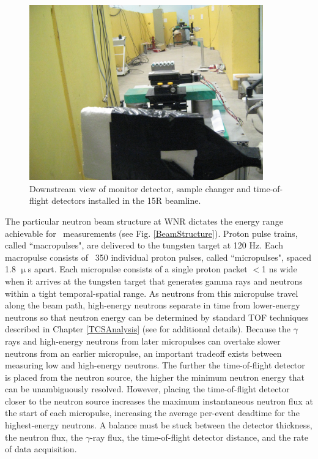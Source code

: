 \begin{figure}[ht!]
    \centering
    \includegraphics[width=0.9\textwidth]{figures/DownstreamFromMonitor.jpg}
    \caption[Monitor detector, sample changer, and time-of-flight detector]
    {
        Downstream view of monitor detector, sample changer and time-of-flight detectors
        installed in the 15R beamline.
    }
    \label{BeamlineDownstream}
\end{figure}

The particular neutron beam structure at WNR dictates the energy range
achievable for \tot\ measurements (see Fig. \ref{BeamStructure}).
Proton pulse trains, called ``macropulses", are delivered to the tungsten target at 120 Hz.
Each macropulse consists of ~350 individual proton pulses, called ``micropulses", spaced 1.8 
$\upmu$s apart. Each micropulse consists of a single proton packet $<$1 ns wide when it 
arrives at the tungsten target that generates gamma rays and neutrons within a tight
temporal-spatial range. As neutrons from this micropulse travel along the beam path, 
high-energy neutrons separate in time from lower-energy neutrons so that neutron
energy can be determined by standard TOF techniques described in Chapter
\ref{TCSAnalysis} (see \cite{Moore1980} for additional details).
Because the $\gamma$ rays and high-energy neutrons from later micropulses can
overtake slower neutrons from an earlier micropulse, an important tradeoff
exists between measuring low and high-energy neutrons. The further the time-of-flight
detector is placed from the neutron source, the higher the minimum neutron energy that can be 
unambiguously resolved. However, placing the time-of-flight detector closer to the neutron source
increases the maximum instantaneous neutron flux at the start of each
micropulse, increasing the average per-event deadtime for the highest-energy
neutrons. A balance must be stuck between the detector thickness, the neutron
flux, the $\gamma$-ray flux, the time-of-flight detector distance, and the rate
of data acquisition.

